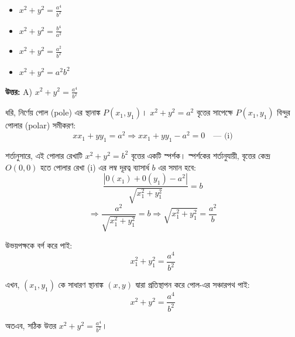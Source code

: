 \documentclass[12pt, a4paper]{article}
\begin{document}
\begin{itemize}[label={}, leftmargin=1cm, itemsep=0.5em]
    \item[\textbf{A)}] $x^2 + y^2 = \frac{a^4}{b^2}$
    \item[\textbf{B)}] $x^2 + y^2 = \frac{b^4}{a^2}$
    \item[\textbf{C)}] $x^2 + y^2 = \frac{a^2}{b^2}$
    \item[\textbf{D)}] $x^2 + y^2 = a^2 b^2$
\end{itemize}

\vspace{0.5em}
\begin{tcolorbox}[answerbox]
    \textbf{\color{success} উত্তর:} A) $x^2 + y^2 = \frac{a^4}{b^2}$
\end{tcolorbox}
\vspace{1em}

\begin{tcolorbox}[solutionbox={সমাধান (Solution)}]
    \noindent
    ধরি, নির্ণেয় পোল (pole) এর স্থানাঙ্ক $P(x_1, y_1)$। $x^2 + y^2 = a^2$ বৃত্তের সাপেক্ষে $P(x_1, y_1)$ বিন্দুর পোলার (polar) সমীকরণ:
    \[ xx_1 + yy_1 = a^2 \Rightarrow xx_1 + yy_1 - a^2 = 0 \quad \text{--- (i)} \]
    
    \vspace{0.5em}
    শর্তানুসারে, এই পোলার রেখাটি $x^2 + y^2 = b^2$ বৃত্তের একটি স্পর্শক। স্পর্শকের শর্তানুযায়ী, বৃত্তের কেন্দ্র $O(0, 0)$ হতে পোলার রেখা (i) এর লম্ব দূরত্ব ব্যাসার্ধ $b$ এর সমান হবে:
    \[ \frac{|0(x_1) + 0(y_1) - a^2|}{\sqrt{x_1^2 + y_1^2}} = b \]
    \[ \Rightarrow \frac{a^2}{\sqrt{x_1^2 + y_1^2}} = b \Rightarrow \sqrt{x_1^2 + y_1^2} = \frac{a^2}{b} \]
    
    \vspace{0.5em}
    উভয়পক্ষকে বর্গ করে পাই:
    \[ x_1^2 + y_1^2 = \frac{a^4}{b^2} \]
    
    \vspace{0.5em}
    এখন, $(x_1, y_1)$ কে সাধারণ স্থানাঙ্ক $(x, y)$ দ্বারা প্রতিস্থাপন করে পোল-এর সঞ্চারপথ পাই:
    \[ x^2 + y^2 = \frac{a^4}{b^2} \]
    
    \vspace{0.5em}
    অতএব, সঠিক উত্তর $x^2 + y^2 = \frac{a^4}{b^2}$।
\end{tcolorbox}
\end{document}
